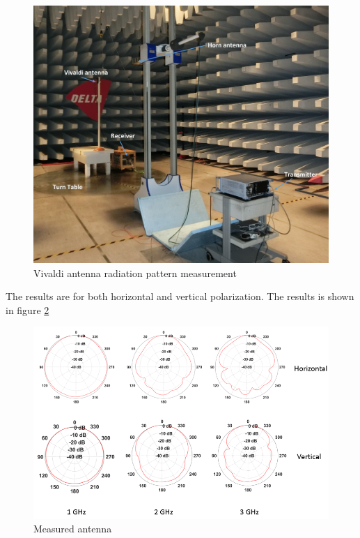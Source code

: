 \begin{figure}[t] 
\includegraphics[width=\linewidth]{Figures/AntennaMesearment.png}
\caption{Vivaldi antenna radiation pattern measurement} 
\label{fig:MeasuredAntenna}
\end{figure}
The results are for both horizontal and vertical polarization. The results is shown in figure \ref{fig:MeasuredAntenna}
\begin{figure} 
\includegraphics[width=\linewidth]{Vivaldi/MeasuredAntennas.PNG}
\caption{Measured antenna } 
\label{fig:MeasuredAntenna}
\end{figure}

